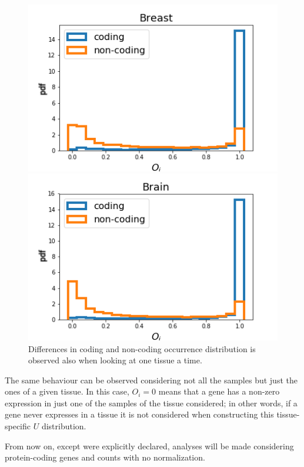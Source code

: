 \begin{figure}[htb!]
    \centering
    \begin{minipage}{0.45\textwidth}
    \includegraphics[width=0.95\linewidth]{pictures/structure/gtex/U_Breast.png}
    \end{minipage}
    \hspace{2mm}
    \begin{minipage}{0.45\textwidth}
    \includegraphics[width=0.95\linewidth]{pictures/structure/gtex/U_Brain.png}
    \end{minipage}
    \caption{Differences in coding and non-coding occurrence distribution is observed also when looking at one tissue a time.}
    \label{fig:structure/gtex/U_tissues}
\end{figure}

The same behaviour can be observed considering not all the samples but just the ones of a given tissue. In this case, $O_i=0$ means that a gene has a non-zero expression in just one of the samples of the tissue considered; in other words, if a gene never expresses in a tissue it is not considered when constructing this tissue-specific $U$ distribution.

From now on, except were explicitly declared, analyses will be made considering protein-coding genes and counts with no normalization.